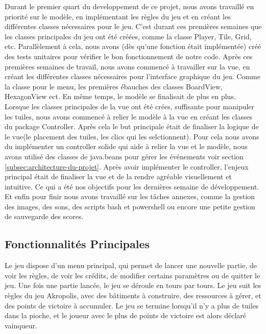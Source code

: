 \documentclass{article}
\begin{document}
    Durant le premier quart du developpement de ce projet, nous avons travaillé en priorité sur le modèle, en implémentant les règles du jeu et en créant les différentes classes nécessaires pour le jeu.
    C'est durant ces premières semaines que les classes principales du jeu ont été créées, comme la classe Player, Tile, Grid, etc.
    Parallèlement à cela, nous avons (dès qu'une fonction était implémentée) créé des tests unitaires pour vérifier le bon fonctionnement de notre code.
    Après ces premières semaines de travail, nous avons commencé à travailler sur la vue, en créant les différentes classes nécessaires pour l'interface graphique du jeu.
    Comme la classe pour le menu, les premières ébauches des classes BoardView, HexagonView ect.
    En même temps, le modèle se finalisait de plus en plus.
    Lorsque les classes principales de la vue ont été crées, suffisante pour manipuler les tuiles, nous avons commencé à relier le modèle à la vue en créant les classes du package Controller.
    Après cela le but principale était de finaliser la logique de le vue(le placement des tuiles, les clics qui les selctionnent).
    Pour cela nous avons du implémenter un controller solide qui aide à relier la vue et le modèle, nous avons utilisé des classes de java.beans pour gérer les événements voir section \ref{subsec:architecture-du-projet}.
    Après avoir implémenter le controller, l'enjeux principal était de finaliser la vue et de la rendre agréable visuellement et intuitive.
    Ce qui a été nos objectifs pour les dernières semaine de développement.
    Et enfin pour finir nous avons travaillé sur les tâches annexes, comme la gestion des images, des sons, des scripts bash et powershell ou encore une petite gestion de sauvegarde des scores.

    \subsection{Fonctionnalités Principales}\label{subsec:fonctionnalites-principales}

    Le jeu dispose d'un menu principal, qui permet de lancer une nouvelle partie, de voir les règles, de voir les crédits, de modifier certains paramètres ou de quitter le jeu.
    Une fois une partie lancée, le jeu se déroule en tours par tours.
    Le jeu suit les règles du jeu Akropolis, avec des bâtiments à construire, des ressources à gérer, et des points de victoire à accumuler.
    Le jeu se termine lorsqu'il n'y a plus de tuiles dans la pioche, et le joueur avec le plus de points de victoire est alors déclaré vainqueur.
\end{document}
